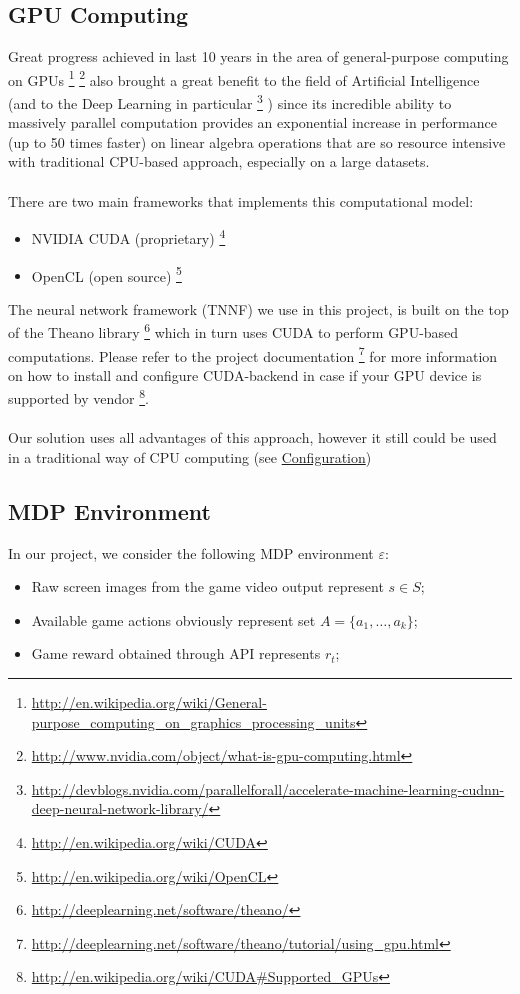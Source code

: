 \documentclass[a4paper,oneside,dvipsnames]{article}
\begin{document}
\subsection[GPU Computing]{GPU Computing}
\label{sec:gpuComputing}
Great progress achieved in last 10 years in the area of general-purpose computing on GPUs
\footnote{\url{http://en.wikipedia.org/wiki/General-purpose\_computing\_on\_graphics\_processing\_units}}
\footnote{\url{http://www.nvidia.com/object/what-is-gpu-computing.html}}
also brought a great benefit to the field of Artificial Intelligence (and to the Deep Learning in particular
\footnote{\url{http://devblogs.nvidia.com/parallelforall/accelerate-machine-learning-cudnn-deep-neural-network-library/}}
) since its incredible ability to massively parallel computation provides an exponential increase in performance (up to 50 times faster) on linear algebra operations that are so resource intensive with traditional CPU-based approach, especially on a large datasets.\\\\
There are two main frameworks that implements this computational model:
\begin{itemize}
    \item NVIDIA CUDA (proprietary)
    \footnote{\url{http://en.wikipedia.org/wiki/CUDA}}
    \item OpenCL (open source)
    \footnote{\url{http://en.wikipedia.org/wiki/OpenCL}}
    \\
\end{itemize}
The neural network framework (TNNF) we use in this project, is built on the top of the Theano library
\footnote{\url{http://deeplearning.net/software/theano/}}
which in turn uses CUDA to perform GPU-based computations. Please refer to the project documentation
\footnote{\url{http://deeplearning.net/software/theano/tutorial/using\_gpu.html}}
for more information on how to install and configure CUDA-backend in case if your GPU device is supported by vendor
\footnote{\url{http://en.wikipedia.org/wiki/CUDA\#Supported_GPUs}}.\\\\
Our solution uses all advantages of this approach, however it still could be used in a traditional way of CPU computing (see \hyperref[sec:config]{Configuration})


\subsection[MDP Environment]{MDP Environment}
In our project, we consider the following MDP environment $\varepsilon$:
\begin{itemize}
    \item Raw screen images from the game video output represent $s \in S$;
    \item Available game actions obviously represent set $A = \{a_1,\dots,a_k\}$;
    \item Game reward obtained through API represents $r_t$;
\end{itemize}
\end{document}
